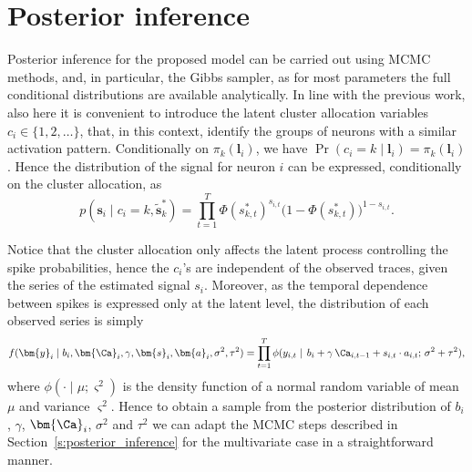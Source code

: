 \section{Posterior inference}
Posterior inference for the proposed model can be carried out using MCMC methods, and, in particular, the Gibbs sampler, as for most parameters the full conditional distributions are available analytically.
In line with the previous work, also here it is convenient to introduce the latent cluster allocation variables $c_i\in\{1,2,\dots\}$, that, in this context, identify the groups of neurons with a similar activation pattern.
Conditionally on $\pi_k(\bm{l}_i)$, we have $\Pr(c_i = k\mid \bm{l}_i) = \pi_k(\bm{l}_i)$.
Hence the distribution of the signal for neuron $i$ can be expressed, conditionally on the cluster allocation, as
\begin{equation}
p(\bm{s}_i\mid c_i=k,\tilde{\bm{s}}^*_k)= \prod_{t=1}^T \Phi(s_{k,t}^*)^{s_{i,t}}\big(1-\Phi(s_{k,t}^*)\big)^{1-s_{i,t}}.
\label{eq:ch4_distr_signal_clk}
\end{equation}


Notice that the cluster allocation only affects the latent process controlling the spike probabilities, hence the $c_i$'s are independent of the observed traces, given the series of the estimated signal $s_i$. Moreover, as the temporal dependence between spikes is expressed only at the latent level, the distribution of each observed series is simply
\begin{equation}
f(\bm{y}_i\mid b_i, \bm{\Ca}_i,\gamma,\bm{s}_i,\bm{a}_i,\sigma^2,\tau^2) = \prod_{t=1}^T \phi(y_{i,t}\mid\, b_i + \gamma\, \Ca_{i,t-1} + s_{i,t}\cdot a_{i,t};\, \sigma^2+\tau^2),
\label{eq:ch4_lik}
\end{equation}
where $\phi(\cdot\mid\mu;\varsigma^2)$ is the density function of a normal random variable of mean $\mu$ and variance $\varsigma^2$. Hence to obtain a sample from the posterior distribution of $b_i$, $\gamma$, $\bm{\Ca}_i$, $\sigma^2$ and $\tau^2$ we can adapt the MCMC steps described in Section~\ref{s:posterior_inference} for the multivariate case in a straightforward manner.

